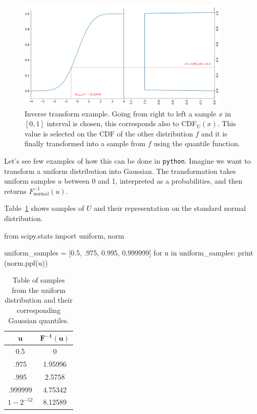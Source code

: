 \begin{figure}[htb]
\centering
\includegraphics[width=0.9\textwidth]{figures/inverse_transform}
\caption{Inverse transform example. Going from right to left a sample $x$ in $[0,1]$ interval is chosen, this corresponds also to CDF$_{\textrm{U}}(x)$. This value is selected on the CDF of the other distribution $f$ and it is finally transformed into a sample from $f$ using the quantile function.}
\label{fig:inverse_transform}
\end{figure}

Let's see few examples of how this can be done in \texttt{python}. Imagine we want to transform a uniform distribution into Gaussian. The transformation takes uniform samples $u$ between 0 and 1, interpreted as a probabilities, and then returns $F_{\textrm{normal}}^{-1}(u)$. 

Table~\ref{tab:transformation} shows samples of $U$ and their representation on the standard normal distribution.

\begin{ipython}
from scipy.stats import uniform, norm

uniform_samples = [0.5, .975, 0.995, 0.999999]
for u in uniform_samples:
    print (norm.ppf(u))
\end{ipython}

\begin{table}[h]
\centering
\begin{tabular}{|c|c|}
\hline
$\mathbf{u}$ & $\mathbf{F^{-1}(u)}$ \\
\hline
0.5 & 0 \\
\hline
.975 & 1.95996 \\
\hline
.995 & 2.5758 \\
\hline
.999999 & 4.75342 \\
\hline
\(1-2^{-52}\) & 8.12589 \\
\hline
\end{tabular}
\caption{Table of samples from the uniform distribution and their corresponding Gaussian quantiles.}
\label{tab:transformation}
\end{table}

